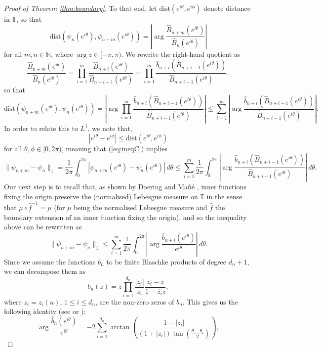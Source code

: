 \documentclass[a4paper,11pt]{article}
\theoremstyle{plain}
\theoremstyle{definition}
\theoremstyle{definition}
\def\dist{\mathrm{dist}}
\begin{document}
\begin{proof}[Proof of Theorem \ref{thm:boundary}]
To that end, let $\dist(e^{i\theta}, e^{i\phi})$ denote distance in $\mathbb{T}$, so that
\[ \dist(\psi_n(e^{i\theta}), \psi_{n+m}(e^{i\theta})) = \left|\arg\frac{\hat{B}_{n+m}(e^{i\theta})}{\hat{B}_n(e^{i\theta})}\right| \]
for all $m, n\in\mathbb{N}$, where $\arg z\in [-\pi, \pi)$. We rewrite the right-hand quotient as
\[ \frac{\hat{B}_{n+m}(e^{i\theta})}{\hat{B}_n(e^{i\theta})} = \prod_{i=1}^m \frac{\hat{B}_{n+i}(e^{i\theta})}{\hat{B}_{n+i-1}(e^{i\theta})} = \prod_{i=1}^m \frac{\hat{b}_{n+i}\left(\hat{B}_{n+i-1}(e^{i\theta})\right)}{\hat{B}_{n+i-1}(e^{i\theta})}, \]
so that
\begin{equation} \label{eq:ineqC}
    \dist(\psi_{n+m}(e^{i\theta}), \psi_n(e^{i\theta})) = \left|\arg\prod_{i=1}^m\frac{\hat{b}_{n+i}\left(\hat{B}_{n+i-1}(e^{i\theta})\right)}{\hat{B}_{n+i-1}(e^{i\theta})}\right| \leq \sum_{i=1}^m \left|\arg\frac{\hat{b}_{n+i}\left(\hat{B}_{n+i-1}(e^{i\theta})\right)}{\hat{B}_{n+i-1}(e^{i\theta})}\right|.
\end{equation}
In order to relate this to $L^1$, we note that,
\[ |e^{i\theta} - e^{i\phi}| \leq \dist(e^{i\theta}, e^{i\phi}) \]
for all $\theta, \phi\in[0, 2\pi)$, meaning that (\ref{eq:ineqC}) implies
\[ \|\psi_{n+m} - \psi_n\|_1 = \frac{1}{2\pi}\int_0^{2\pi} |\psi_{n+m}(e^{i\theta}) - \psi_n(e^{i\theta})|\,d\theta \leq \sum_{i=1}^m\frac{1}{2\pi}\int_0^{2\pi}\left|\arg\frac{\hat{b}_{n+i}\left(\hat{B}_{n+i-1}(e^{i\theta})\right)}{\hat{B}_{n+i-1}(e^{i\theta})}\right|\,d\theta. \]
Our next step is to recall that, as shown by Doering and Ma\~n\'e \cite[Corollary 1.5]{DM91}, inner functions fixing the origin preserve the (normalised) Lebesgue measure on $\mathbb{T}$ in the sense that $\mu\circ \hat{f}^{-1} = \mu$ (for $\mu$ being the normalised Lebesgue measure and $\hat{f}$ the boundary extension of an inner function fixing the origin), and so the inequality above can be rewritten as
\begin{equation} \label{eq:argint}
    \|\psi_{n+m} - \psi_n\|_1 \leq \sum_{i=1}^m\frac{1}{2\pi}\int_0^{2\pi}\left|\arg\frac{\hat{b}_{n+i}\left(e^{i\theta}\right)}{e^{i\theta}}\right|\,d\theta.
\end{equation}
Since we assume the functions $b_n$ to be finite Blaschke products of degree $d_n + 1$, we can decompose them as
\[ b_n(z) = z\prod_{i=1}^{d_n}\frac{|z_i|}{z_i}\frac{z_i - z}{1 - \overline{z_i}z}, \]
where $z_i = z_i(n)$, $1\leq i\leq d_n$, are the non-zero zeros of $b_n$. This gives us the following identity (see \cite[Theorem 2.4]{GMR16} or \cite[Equation 2.1]{Ryb91}):
\[ \arg\frac{\hat{b}_n(e^{i\theta})}{e^{i\theta}} = -2\sum_{i=1}^{d_n} \arctan\left(\frac{1 - |z_i|}{(1 + |z_i|)\tan\left(\frac{\theta - \theta_i}{2}\right)}\right), \]

\end{proof}
\end{document}
